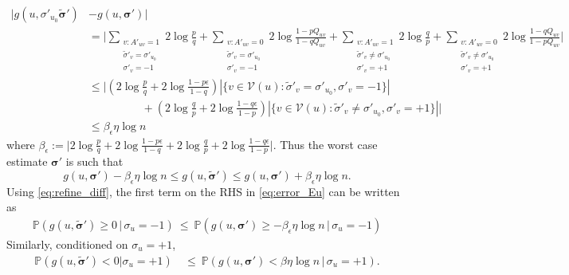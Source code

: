 \documentclass[letterpaper,11pt]{article}
\theoremstyle{definition}
\def\P{\mathbb{P}}
\newcommand{\tsigma}{\tilde{\sigma}}
\newcommand{\bsigma}{\bm{\sigma}}
\newcommand{\tbsigma}{\tilde{\bsigma}}
\def\cV{\mathcal{V}}
\def\cZ{\mathcal{Z}}
\def\wle{ \ \le \ }
\numberwithin{equation}{section}
\newcommand{\eps}{\epsilon}
\theoremstyle{definition}
\def\P{\mathbb{P}}
\newcommand{\tsigma}{\tilde{\sigma}}
\newcommand{\bsigma}{\bm{\sigma}}
\newcommand{\tbsigma}{\tilde{\bsigma}}
\def\cV{\mathcal{V}}
\def\cZ{\mathcal{Z}}
\def\wle{ \ \le \ }
\numberwithin{equation}{section}
\newcommand{\eps}{\epsilon}
\theoremstyle{thmstyletwo}%
\begin{document}
\begin{align}
|g(u,\sigma'_{u_0}\tbsigma')
&- g(u,\bsigma')| \nonumber\\
&= \Bigg|\sum_{\substack{v: A'_{uv}=1 \\ \tsigma'_v=\sigma'_{u_0}\\ \sigma'_v=-1}} 2\log \frac{p}{q} 
+ \sum_{\substack{v : A'_{uv}=0 \\ \tsigma'_v=\sigma'_{u_0}\\ \sigma'_v=-1}} 2\log \frac{1-pQ_{uv}}{1-qQ_{uv}} 
+ \sum_{\substack{v: A'_{uv}=1 \\ \tsigma'_v\neq\sigma'_{u_0}\\ \sigma'_v=+1}} 2\log \frac{q}{p} 
+ \sum_{\substack{v: A'_{uv}=0\\ \tsigma'_v\neq\sigma'_{u_0}\\ \sigma'_v=+1}} 2\log \frac{1-qQ_{uv}}{1-pQ_{uv}}\Bigg| \nonumber\\
&\le \Bigg|\left(2\log \frac{p}{q}+2\log \frac{1-p\eps}{1-q} \right) |\{v\in\cV(u):\tsigma'_v=\sigma'_{u_0}, \sigma'_v=-1\}|\\
& \hspace{2cm}+  \left(2\log \frac{q}{p}  +2\log \frac{1-q\eps}{1-p} \right)|\{v\in\cV(u):\tsigma'_v\neq \sigma'_{u_0}, \sigma'_v=+1\}|\Bigg|\nonumber \\
&\le \beta_\eps \eta \log n
\label{eq:refine_diff}
\end{align}
where $\beta_\eps := \Big|2\log \frac{p}{q}+2\log \frac{1-p\eps}{1-q}+2\log \frac{q}{p}  +2\log \frac{1-q\eps}{1-p} \Big|$. Thus the worst case estimate $\bsigma'$ is such that 
$$g(u,\bsigma') -\beta_\eps \eta \log n \le  g(u,\tbsigma') \le g(u,\bsigma') +\beta_\eps \eta \log n. $$
Using \eqref{eq:refine_diff}, the first term on the RHS in \eqref{eq:error_Eu} can be written as
\begin{align}
\P(g(u,\tbsigma') \ge 0\,|\, \sigma_u = -1) 
\wle \P(g(u,\bsigma') \ge -\beta_\eps \eta\log n\,|\, \sigma_u = -1)
\label{eq:minus_error_simp}
\end{align}
Similarly, conditioned on $\sigma_u=+1$, 
\begin{align}
\P(g(u,\tbsigma') <0|\sigma_u = +1) 
&\wle \P(g(u,\bsigma') <\beta \eta \log n\,|\,\sigma_u = +1).
\label{eq:plus_error}
\end{align}
\end{document}
